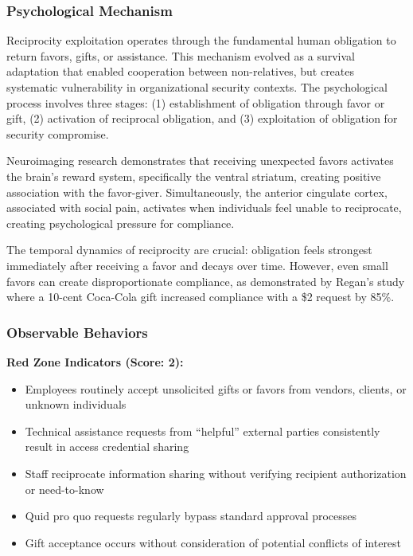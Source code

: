 \documentclass[11pt,a4paper]{article}
\begin{document}
\subsubsection{Psychological Mechanism}

Reciprocity exploitation operates through the fundamental human obligation to return favors, gifts, or assistance. This mechanism evolved as a survival adaptation that enabled cooperation between non-relatives, but creates systematic vulnerability in organizational security contexts. The psychological process involves three stages: (1) establishment of obligation through favor or gift, (2) activation of reciprocal obligation, and (3) exploitation of obligation for security compromise.

Neuroimaging research demonstrates that receiving unexpected favors activates the brain's reward system, specifically the ventral striatum, creating positive association with the favor-giver\cite{rilling2002}. Simultaneously, the anterior cingulate cortex, associated with social pain, activates when individuals feel unable to reciprocate, creating psychological pressure for compliance.

The temporal dynamics of reciprocity are crucial: obligation feels strongest immediately after receiving a favor and decays over time. However, even small favors can create disproportionate compliance, as demonstrated by Regan's study where a 10-cent Coca-Cola gift increased compliance with a \$2 request by 85\%\cite{regan1971}.

\subsubsection{Observable Behaviors}

\textbf{Red Zone Indicators (Score: 2):}
\begin{itemize}
\item Employees routinely accept unsolicited gifts or favors from vendors, clients, or unknown individuals
\item Technical assistance requests from ``helpful'' external parties consistently result in access credential sharing
\item Staff reciprocate information sharing without verifying recipient authorization or need-to-know
\item Quid pro quo requests regularly bypass standard approval processes
\item Gift acceptance occurs without consideration of potential conflicts of interest
\end{itemize}
\end{document}
